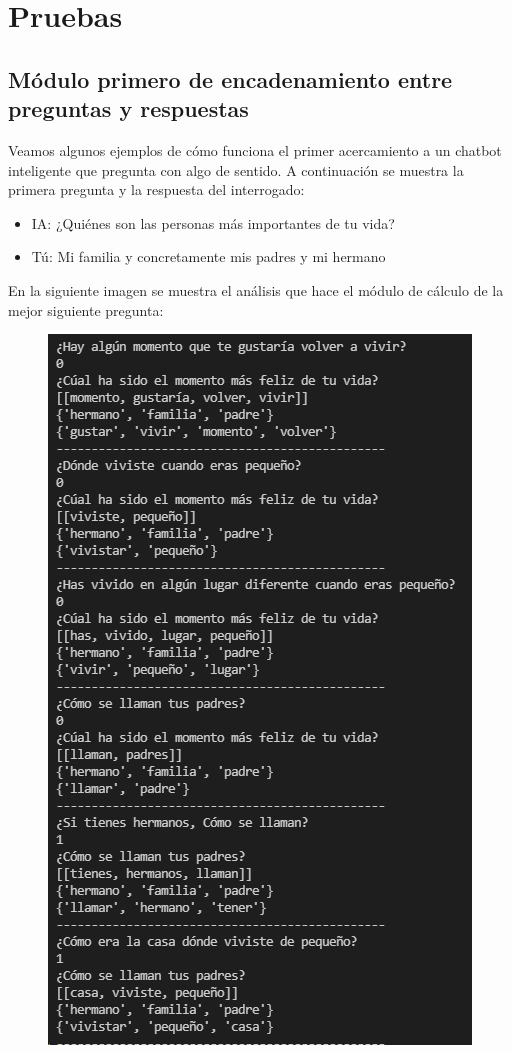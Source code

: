 \chapter{Pruebas}
\label{cap:pruebas}

\section{Módulo primero de encadenamiento entre preguntas y respuestas}
Veamos algunos ejemplos de cómo funciona el primer acercamiento a un chatbot inteligente que pregunta con algo de sentido. A continuación se muestra la primera pregunta y la respuesta del interrogado:
\begin{itemize}
	\item[] IA: ¿Quiénes son las personas más importantes de tu vida?
	\item[] Tú: Mi familia y concretamente mis padres y mi hermano
\end{itemize}

En la siguiente imagen se muestra el análisis que hace el módulo de cálculo de la mejor siguiente pregunta:

\begin{figure}[h]
	\centering
	\includegraphics[scale=0.35]{Imagenes/Vectorial/modulo_encadenamiento_preguntas_respuestas_analisis}
	\caption{}
	\label{fig:moduloencadenamientopreguntasrespuestasanalisis}
\end{figure}


